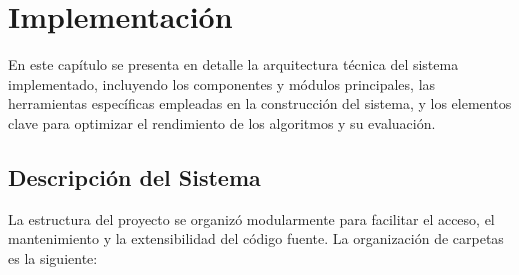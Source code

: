 
\chapter{Implementación}\label{ch:implementacion}
En este capítulo se presenta en detalle la arquitectura técnica del sistema implementado, incluyendo los componentes y
módulos principales, las herramientas específicas empleadas en la construcción del sistema, y los elementos clave para
optimizar el rendimiento de los algoritmos y su evaluación.


\section{Descripción del Sistema}\label{sec:descripcion-del-sistema}
La estructura del proyecto se organizó modularmente para facilitar el acceso, el mantenimiento y la extensibilidad del código fuente.
La organización de carpetas es la siguiente:

